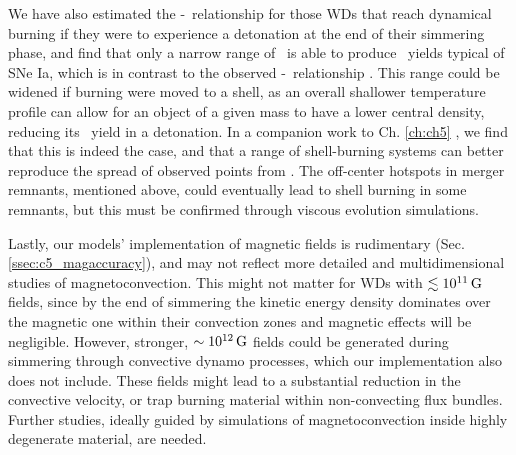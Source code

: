 We have also estimated the \Mtot-\MNi\ relationship for those WDs that reach dynamical burning if they were to experience a detonation at the end of their simmering phase, and find that only a narrow range of \Mtot\ is able to produce \MNi\ yields typical of SNe Ia, which is in contrast to the observed \Mtot-\MNi\ relationship \citep{scalzrs14, chil+15}.  This range could be widened if burning were moved to a shell, as an overall shallower temperature profile can allow for an object of a given mass to have a lower central density, reducing its \Ni\ yield in a detonation.  In a companion work to Ch. \ref{ch:ch5} \citep{herizv16}, we find that this is indeed the case, and that a range of shell-burning systems can better reproduce the spread of observed points from \cite{chil+15}.  The off-center hotspots in merger remnants, mentioned above, could eventually lead to shell burning in some remnants, but this must be confirmed through viscous evolution simulations.

Lastly, our models' implementation of magnetic fields is rudimentary (Sec. \ref{ssec:c5_magaccuracy}), and may not reflect more detailed and multidimensional studies of magnetoconvection.  This might not matter for WDs with $\lesssim 10^{11}\,\mathrm{G}$ fields, since by the end of simmering the kinetic energy density dominates over the magnetic one within their convection zones and magnetic effects will be negligible.  However, stronger, $\sim10^{12}\,\mathrm{G}$ fields could be generated during simmering through convective dynamo processes, which our implementation also does not include.  These fields might lead to a substantial reduction in the convective velocity, or trap burning material within non-convecting flux bundles.  Further studies, ideally guided by simulations of magnetoconvection inside highly degenerate material, are needed.



